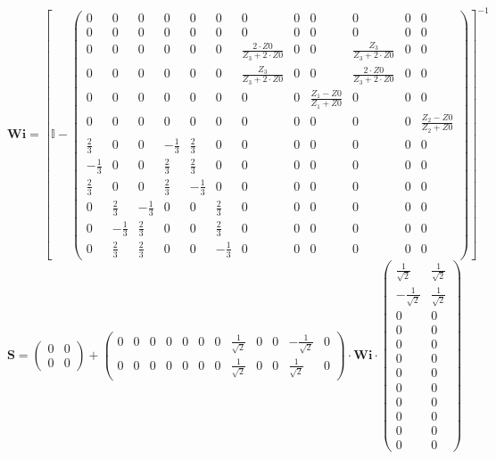 \[ \mathbf{Wi} =  \left[ \mathbb{I}  - \left(\begin{smallmatrix} 0 & 0
& 0 & 0 & 0 & 0 & 0 & 0 & 0 & 0 & 0 & 0 \\ 0 & 0 & 0 & 0 & 0 & 0 & 0 &
0 & 0 & 0 & 0 & 0 \\ 0 & 0 & 0 & 0 & 0 & 0 & \frac{2\cdot
Z0}{Z_3+2\cdot Z0} & 0 & 0 & \frac{Z_3}{Z_3+2\cdot Z0} & 0 & 0 \\ 0 &
0 & 0 & 0 & 0 & 0 & \frac{Z_3}{Z_3+2\cdot Z0} & 0 & 0 & \frac{2\cdot
Z0}{Z_3+2\cdot Z0} & 0 & 0 \\ 0 & 0 & 0 & 0 & 0 & 0 & 0 & 0 & \frac{
Z_1 -Z0}{ Z_1 +Z0} & 0 & 0 & 0 \\ 0 & 0 & 0 & 0 & 0 & 0 & 0 & 0 & 0 &
0 & 0 & \frac{ Z_2 -Z0}{ Z_2 +Z0} \\ \frac{2}{3} & 0 & 0 &
-\frac{1}{3} & \frac{2}{3} & 0 & 0 & 0 & 0 & 0 & 0 & 0 \\ -\frac{1}{3}
& 0 & 0 & \frac{2}{3} & \frac{2}{3} & 0 & 0 & 0 & 0 & 0 & 0 & 0 \\
\frac{2}{3} & 0 & 0 & \frac{2}{3} & -\frac{1}{3} & 0 & 0 & 0 & 0 & 0 &
0 & 0 \\ 0 & \frac{2}{3} & -\frac{1}{3} & 0 & 0 & \frac{2}{3} & 0 & 0
& 0 & 0 & 0 & 0 \\ 0 & -\frac{1}{3} & \frac{2}{3} & 0 & 0 &
\frac{2}{3} & 0 & 0 & 0 & 0 & 0 & 0 \\ 0 & \frac{2}{3} & \frac{2}{3} &
0 & 0 & -\frac{1}{3} & 0 & 0 & 0 & 0 & 0 & 0 \end{smallmatrix}\right)
\right]^{-1}  \]
\[ \mathbf{S} = \left(\begin{smallmatrix} 0 & 0 \\ 0 & 0
\end{smallmatrix}\right) + \left(\begin{smallmatrix} 0 & 0 & 0 & 0 & 0
& 0 & 0 & \frac{1}{\sqrt{2}} & 0 & 0 & -\frac{1}{\sqrt{2}} & 0 \\ 0 &
0 & 0 & 0 & 0 & 0 & 0 & \frac{1}{\sqrt{2}} & 0 & 0 &
\frac{1}{\sqrt{2}} & 0 \end{smallmatrix}\right) \cdot \mathbf{Wi}
\cdot\left(\begin{smallmatrix} \frac{1}{\sqrt{2}} & \frac{1}{\sqrt{2}}
\\ -\frac{1}{\sqrt{2}} & \frac{1}{\sqrt{2}} \\ 0 & 0 \\ 0 & 0 \\ 0 & 0
\\ 0 & 0 \\ 0 & 0 \\ 0 & 0 \\ 0 & 0 \\ 0 & 0 \\ 0 & 0 \\ 0 & 0
\end{smallmatrix}\right) \]
